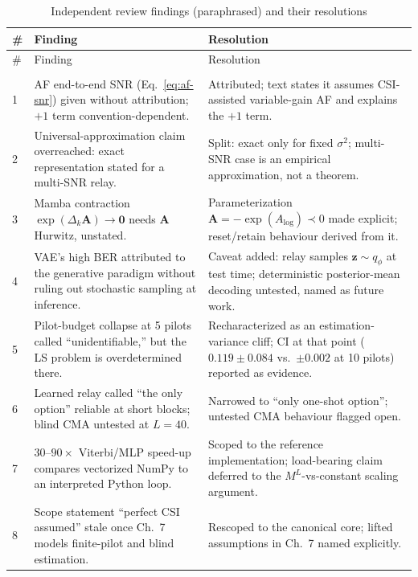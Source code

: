 \begin{longtable}[]{@{}p{0.4cm}p{6.6cm}p{7.0cm}@{}}
\caption[Independent review findings and resolutions]{Independent review findings (paraphrased) and their resolutions}\label{tbl:appF}\tabularnewline
\toprule\noalign{}
\# & Finding & Resolution \\
\midrule\noalign{}
\endfirsthead
\toprule\noalign{}
\# & Finding & Resolution \\
\midrule\noalign{}
\endhead
\bottomrule\noalign{}
\endlastfoot
\multicolumn{3}{@{}l}{\textbf{F.1 Substantive}}\\
1 & AF end-to-end SNR (Eq.~\ref{eq:af-snr}) given without attribution; $+1$ term convention-dependent. & Attributed; text states it assumes CSI-assisted variable-gain AF and explains the $+1$ term. \\
2 & Universal-approximation claim overreached: exact representation stated for a multi-SNR relay. & Split: exact only for fixed $\sigma^2$; multi-SNR case is an empirical approximation, not a theorem. \\
3 & Mamba contraction $\exp(\Delta_k\mathbf{A})\to\mathbf{0}$ needs $\mathbf{A}$ Hurwitz, unstated. & Parameterization $\mathbf{A}=-\exp(A_{\log})\prec 0$ made explicit; reset/retain behaviour derived from it. \\
4 & VAE's high BER attributed to the generative paradigm without ruling out stochastic sampling at inference. & Caveat added: relay samples $\mathbf{z}\sim q_\phi$ at test time; deterministic posterior-mean decoding untested, named as future work. \\
5 & Pilot-budget collapse at 5 pilots called ``unidentifiable,'' but the LS problem is overdetermined there. & Recharacterized as an estimation-variance cliff; CI at that point ($0.119\pm0.084$ vs.\ $\pm0.002$ at 10 pilots) reported as evidence. \\
6 & Learned relay called ``the only option'' reliable at short blocks; blind CMA untested at $L{=}40$. & Narrowed to ``only one-shot option''; untested CMA behaviour flagged open. \\
7 & $30$--$90\times$ Viterbi/MLP speed-up compares vectorized NumPy to an interpreted Python loop. & Scoped to the reference implementation; load-bearing claim deferred to the $M^{L}$-vs-constant scaling argument. \\
8 & Scope statement ``perfect CSI assumed'' stale once Ch.~7 models finite-pilot and blind estimation. & Rescoped to the canonical core; lifted assumptions in Ch.~7 named explicitly. \\

\end{longtable}
